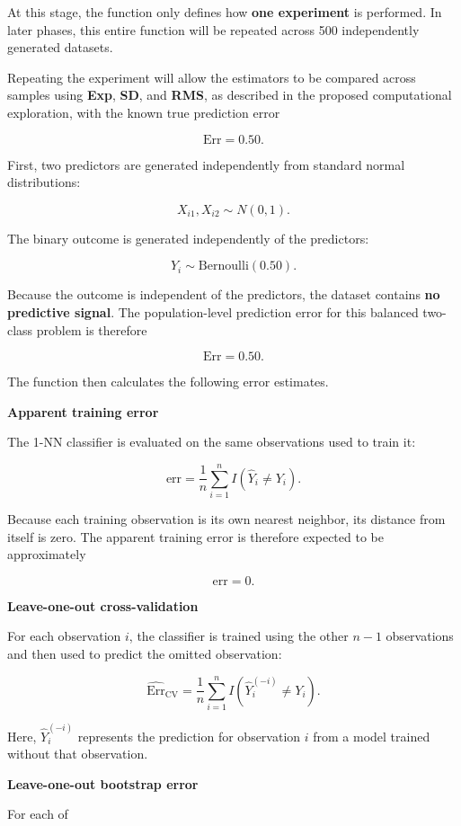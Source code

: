 \documentclass[
  letterpaper,
  DIV=11,
  numbers=noendperiod]{scrreprt}
\begin{document}
At this stage, the function only defines how \textbf{one experiment} is
performed. In later phases, this entire function will be repeated across
500 independently generated datasets.

Repeating the experiment will allow the estimators to be compared across
samples using \textbf{Exp}, \textbf{SD}, and \textbf{RMS}, as described
in the proposed computational exploration, with the known true
prediction error

\[
\mathrm{Err}=0.50.
\]

First, two predictors are generated independently from standard normal
distributions:

\[
X_{i1},X_{i2}\sim N(0,1).
\]

The binary outcome is generated independently of the predictors:

\[
Y_i\sim\mathrm{Bernoulli}(0.50).
\]

Because the outcome is independent of the predictors, the dataset
contains \textbf{no predictive signal}. The population-level prediction
error for this balanced two-class problem is therefore

\[
\mathrm{Err}=0.50.
\]

The function then calculates the following error estimates.

\textbf{Apparent training error}

The 1-NN classifier is evaluated on the same observations used to train
it:

\[
\mathrm{err}
=
\frac{1}{n}
\sum_{i=1}^{n}
I(\widehat{Y}_i\neq Y_i).
\]

Because each training observation is its own nearest neighbor, its
distance from itself is zero. The apparent training error is therefore
expected to be approximately

\[
\mathrm{err}=0.
\]

\textbf{Leave-one-out cross-validation}

For each observation \(i\), the classifier is trained using the other
\(n-1\) observations and then used to predict the omitted observation:

\[
\widehat{\mathrm{Err}}_{\mathrm{CV}}
=
\frac{1}{n}
\sum_{i=1}^{n}
I(\widehat{Y}_i^{(-i)}\neq Y_i).
\]

Here, \(\widehat{Y}_i^{(-i)}\) represents the prediction for observation
\(i\) from a model trained without that observation.

\textbf{Leave-one-out bootstrap error}

For each of
\end{document}

